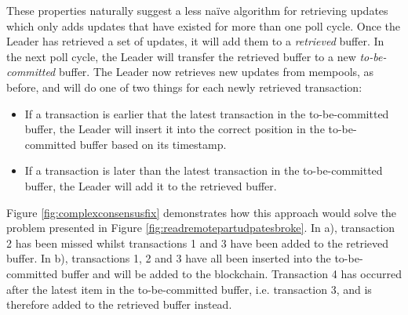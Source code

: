 \documentclass[12pt,a4paper,twoside,openright]{report}
\begin{document}
	These properties naturally suggest a less na{\"i}ve algorithm for retrieving updates which only adds updates that have existed for more than one poll cycle.
	Once the Leader has retrieved a set of updates, it will add them to a \textit{retrieved} buffer.
	In the next poll cycle, the Leader will transfer the retrieved buffer to a new \textit{to-be-committed} buffer.
	The Leader now retrieves new updates from mempools, as before, and will do one of two things for each newly retrieved transaction:
	\begin{itemize}
		\item If a transaction is earlier that the latest transaction in the to-be-committed buffer, the Leader will insert it into the correct position in the to-be-committed buffer based on its timestamp.
		\item If a transaction is later than the latest transaction in the to-be-committed buffer, the Leader will add it to the retrieved buffer.
	\end{itemize}
	Figure \ref{fig:complexconsensusfix} demonstrates how this approach would solve the problem presented in Figure \ref{fig:readremotepartudpatesbroke}.
	In a), transaction 2 has been missed whilst transactions 1 and 3 have been added to the retrieved buffer. 
	In b), transactions 1, 2 and 3 have all been inserted into the to-be-committed buffer and will be added to the blockchain.
	Transaction 4 has occurred after the latest item in the to-be-committed buffer, i.e. transaction 3, and is therefore added to the retrieved buffer instead. \\
\end{document}
